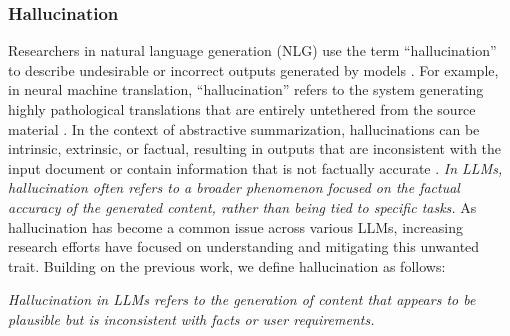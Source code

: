\subsubsection{Hallucination}
\label{sec:hallucination}
Researchers in natural language generation (NLG) use the term ``hallucination'' to describe undesirable or incorrect outputs generated by models \cite{ji2023survey}. For example, in neural machine translation, ``hallucination'' refers to the system generating highly pathological translations that are entirely untethered from the source material \cite{lee2018hallucinations}. In the context of abstractive summarization, hallucinations can be intrinsic, extrinsic, or factual, resulting in outputs that are inconsistent with the input document or contain information that is not factually accurate \cite{maynez2020faithfulness}. \textit{In LLMs, hallucination often refers to a broader phenomenon focused on the factual accuracy of the generated content, rather than being tied to specific tasks.} As hallucination has become a common issue across various LLMs, increasing research efforts \cite{huang2023survey, zhang2023siren, li2023halueval, manakul2023selfcheckgpt, chen2023hallucination, xu2024hallucination, dhuliawala2023chain, mishra2024fine, li2024inference, li2024dawn,Overshadowing2024} have focused on understanding and mitigating this unwanted trait. Building on the previous work, we define hallucination as follows:

\begin{tcolorbox}[definition]
\textit{Hallucination in LLMs refers to the generation of content that appears to be plausible but is inconsistent with facts or user requirements.}
\end{tcolorbox}

